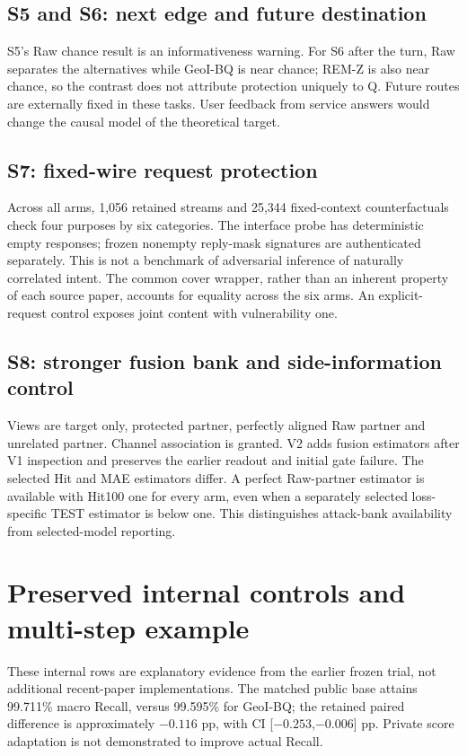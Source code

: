 \subsection{S5 and S6: next edge and future destination}


S5's Raw chance result is an informativeness warning. For S6 after the turn,
Raw separates the alternatives while GeoI-BQ is near chance; REM-Z is also
near chance, so the contrast does not attribute protection uniquely to Q.
Future routes are externally fixed in these tasks. User feedback from service
answers would change the causal model of the theoretical target.

\subsection{S7: fixed-wire request protection}

Across all arms, 1,056 retained streams and 25,344 fixed-context counterfactuals
check four purposes by six categories. The interface probe has deterministic
empty responses; frozen nonempty reply-mask signatures are authenticated separately.
This is not a benchmark of adversarial inference of naturally correlated intent.
The common cover wrapper, rather than an inherent property of each source paper,
accounts for equality across the six arms. An explicit-request control exposes
joint content with vulnerability one.

\subsection{S8: stronger fusion bank and side-information control}


Views are target only, protected partner, perfectly aligned Raw partner and
unrelated partner. Channel association is granted. V2 adds fusion estimators
after V1 inspection and preserves the earlier readout and initial gate failure.
The selected Hit and MAE estimators differ. A perfect Raw-partner estimator
is available with Hit100 one for every arm, even when a separately selected
loss-specific TEST estimator is below one. This distinguishes attack-bank
availability from selected-model reporting.

\section{Preserved internal controls and multi-step example}

These internal rows are explanatory evidence from the earlier frozen trial,
not additional recent-paper implementations. The matched public base attains
99.711\% macro Recall, versus 99.595\% for GeoI-BQ; the retained paired
difference is approximately $-0.116$ pp, with CI [$-0.253$,$-0.006$] pp.
Private score adaptation is not demonstrated to improve actual Recall.

